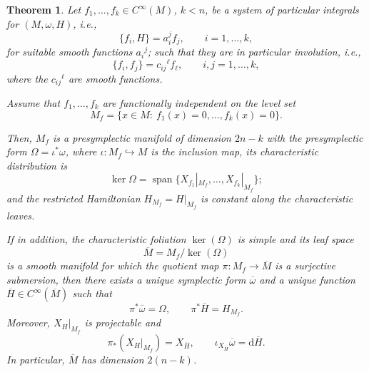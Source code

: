 \documentclass[10pt,a4paper]{amsart}
\newtheorem{theorem}{Theorem}
\begin{document}
\begin{theorem}
\label{maintheorem}
Let $f_1,\ldots,f_k\in C^\infty(M)$, $k<n$, be a system of particular integrals for $(M,\omega,H)$, i.e., 
\begin{equation*}
\{f_i,H\}=a_{i}^j f_j,
\qquad i=1,\ldots,k,
\end{equation*}
for suitable smooth functions $a_i{}^j$; such that they are in particular involution, i.e.,
\begin{equation}
\{f_i,f_j\}=c_{ij}{}^\ell f_\ell,
\qquad i,j=1,\ldots,k,
\label{eq:weak-involution}
\end{equation}
where the $c_{ij}{}^\ell$ are smooth functions. 

Assume that $f_1,\ldots,f_k$ are functionally independent on the level set
\begin{equation*}
M_f=\{x\in M:\ f_1(x)=0,\ldots,f_k(x)=0\}.
\end{equation*}

Then, $M_f$ is a presymplectic manifold of dimension $2n-k$ with the presymplectic form $\Omega=\iota^{*}\omega$, where $\iota\colon M_f \hookrightarrow M$ is the inclusion map, its characteristic distribution is
\begin{equation*}
\ker\Omega=\operatorname{span}\bigl\{X_{f_1}|_{M_f},\ldots,X_{f_k}|_{M_f}\bigr\};
\end{equation*}
and the restricted Hamiltonian $H_{M_f}=H|_{M_f}$ is constant along the characteristic leaves.

If in addition, the characteristic foliation $\ker(\Omega)$ is simple and its leaf space
\[
  \overline{M}=M_f/\ker(\Omega)
\]
is a smooth manifold for which the quotient map
\(\pi:M_f\to \overline{M}\) is a surjective submersion, then there exists a unique symplectic form $\overline{\omega}$ and a unique function
$\overline{H}\in C^\infty(\overline{M})$ such that
\begin{equation}
  \pi^*\overline{\omega}=\Omega,
  \qquad
  \pi^*\overline{H}=H_{M_f}.
  \label{eq:reduced-form-and-Hamiltonian}
\end{equation}
Moreover, $X_H|_{M_f}$ is projectable and
\begin{equation}
  \pi_*(X_H|_{M_f})=X_{\overline{H}},
  \qquad
  \iota_{X_{\overline{H}}}\overline{\omega}
  =\mathrm d\overline{H}.
  \label{eq:projected-Hamiltonian-vector-field}
\end{equation}
In particular, $\overline{M}$ has dimension $2(n-k)$.
\end{theorem}
\end{document}
